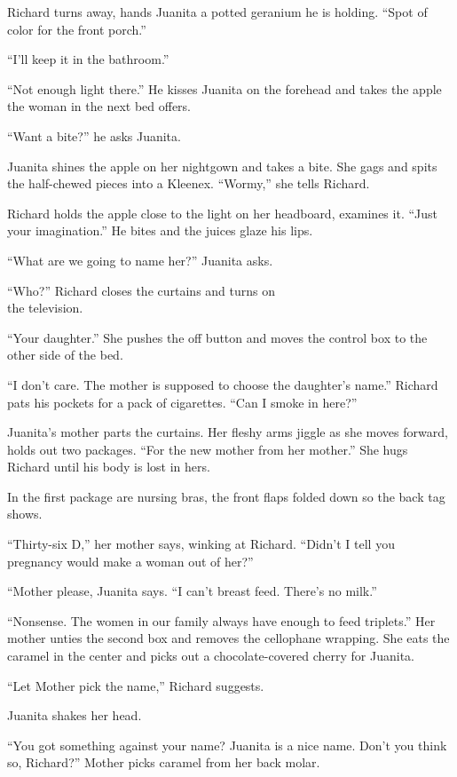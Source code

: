 \documentclass[
]{article}
\begin{document}
Richard turns away, hands Juanita a potted geranium he is holding.
``Spot of color for the front porch.''

``I'll keep it in the bathroom.''

``Not enough light there.'' He kisses Juanita on the forehead and takes
the apple the woman in the next bed offers.

``Want a bite?'' he asks Juanita.

Juanita shines the apple on her nightgown and takes a bite. She gags and
spits the half-chewed pieces into a Kleenex. ``Wormy,'' she tells
Richard.

Richard holds the apple close to the light on her headboard, examines
it. ``Just your imagina­tion.'' He bites and the juices glaze his lips.

``What are we going to name her?'' Juanita asks.

``Who?'' Richard closes the curtains and turns on\\
the television.

``Your daughter.'' She pushes the off button and moves the control box
to the other side of the bed.

``I don't care. The mother is supposed to choose the daughter's name.''
Richard pats his pock­ets for a pack of cigarettes. ``Can I smoke in
here?''

Juanita's mother parts the curtains. Her fleshy arms jiggle as she moves
forward, holds out two packages. ``For the new mother from her mother.''
She hugs Richard until his body is lost in hers.

In the first package are nursing bras, the front flaps folded down so
the back tag shows.

``Thirty-six D,'' her mother says, winking at Richard. ``Didn't I tell
you pregnancy would make a woman out of her?''

``Mother please, Juanita says. ``I can't breast feed. There's no milk.''

``Nonsense. The women in our family always have enough to feed
triplets.'' Her mother unties the second box and removes the cellophane
wrapping. She eats the caramel in the center and picks out a
chocolate-covered cherry for Juanita.

``Let Mother pick the name,'' Richard suggests.

Juanita shakes her head.

``You got something against your name? Juanita is a nice name. Don't you
think so, Richard?'' Mother picks caramel from her back molar.
\end{document}
